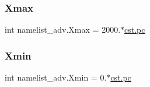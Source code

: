\subsubsection{\texorpdfstring{Xmax}{Xmax}}
{\footnotesize\ttfamily int namelist\+\_\+adv.\+Xmax = 2000.$\ast$\hyperlink{constants_8h_a2884cd030c4c825754349a525a1d06ce}{cst.\+pc}}

\mbox{\label{namespacenamelist__adv_a8fed267d735cd6b19108ee392397882e}} 
\subsubsection{\texorpdfstring{Xmin}{Xmin}}
{\footnotesize\ttfamily int namelist\+\_\+adv.\+Xmin = 0.$\ast$\hyperlink{constants_8h_a2884cd030c4c825754349a525a1d06ce}{cst.\+pc}}

